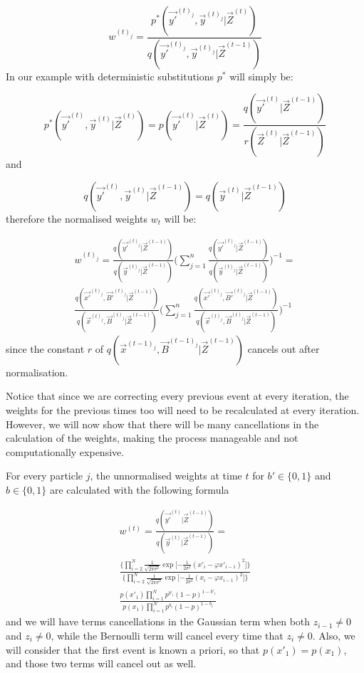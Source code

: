 \[
w^{(t)_j} = \frac{p^*(\vec{y'}^{(t)_j}, \vec{y}^{(t)_j} | \vec{Z}^{(t)})} {q(\vec{y'}^{(t)_j}, \vec{y}^{(t)_j}|\vec{Z}^{(t-1)})}
\]
In our example with deterministic substitutions $p^*$ will simply be:

\[
p^*(\vec{y'}^{(t)}, \vec{y}^{(t)} | \vec{Z}^{(t)}) = p(\vec{y'}^{(t)} | \vec{Z}^{(t)}) = \frac{ q(\vec{y'}^{(t)}|\vec{Z}^{(t-1)})} {r(\vec{Z}^{(t)} | \vec{Z}^{(t-1)})}
\]
and

\[
q(\vec{y'}^{(t)}, \vec{y}^{(t)} | \vec{Z}^{(t-1)}) = q(\vec{y}^{(t)} | \vec{Z}^{(t-1)})
\]
therefore the normalised weights $w_t$ will be:

\begin{multline*}
w^{(t)_j} = \frac{q(\vec{y'}^{(t)_j} | \vec{Z}^{(t-1)}) }{q(\vec{y}^{(t)_j} | \vec{Z}^{(t-1)})}\Bigg( \sum_{j=1}^n  \frac{q(\vec{y'}^{(t)_j} | \vec{Z}^{(t-1)}) }{q(\vec{y}^{(t)_j} | \vec{Z}^{(t-1)})}\Bigg)^{-1} = \\
\frac{q(\vec{x'}^{(t)_j}, \vec{B'}^{(t)_j} | \vec{Z}^{(t-1)}) }{q(\vec{x}^{(t)_j}, \vec{B}^{(t)_j} | \vec{Z}^{(t-1)})}\Bigg( \sum_{j=1}^n \frac{q(\vec{x'}^{(t)_j}, \vec{B'}^{(t)_j} | \vec{Z}^{(t-1)}) }{q(\vec{x}^{(t)_j}, \vec{B}^{(t)_j} | \vec{Z}^{(t-1)})}\Bigg)^{-1}
\end{multline*}
since the constant $r$ of $q(\vec{x}^{(t-1)_j},\vec{B}^{(t-1)_j} | \vec{Z}^{(t-1)})$ cancels out after normalisation.

Notice that since we are correcting every previous event at every iteration, the weights for the previous times too will need to be recalculated at every iteration. However, we will now show that there will be many cancellations in the calculation of the weights, making the process manageable and not computationally expensive.

For every particle $j$, the unnormalised weights at time $t$ for $b' \in \{0,1\}$ and $b \in \{0,1\}$ are calculated with the following formula

\begin{multline*}
w^{(t)} = \frac{q(\vec{y'}^{(t)} | \vec{Z}^{(t-1)}) }{q(\vec{y}^{(t)} | \vec{Z}^{(t-1)})} = \\
\frac{\bigg \{ \prod_{i=2}^{N}  \frac{1}{\sqrt{2 \pi \sigma^{2}}} \exp \bigg [ { - \frac{1}{2 \sigma^{2}} }  (x'_{i} - \varphi x'_{i-1})^{2} \bigg ] \bigg \} }{\bigg \{ \prod_{i=2}^{N}  \frac{1}{\sqrt{2 \pi \sigma^{2}}} \exp \bigg [ { - \frac{1}{2 \sigma^{2}} }  (x_{i} - \varphi x_{i-1})^{2} \bigg ] \bigg \} } \\
\frac{p(x'_{1}) \prod_{i=1}^{N} p^{b'_i} (1 - p)^{1-b'_{i}}  }{ p(x_{1}) \prod_{i=1}^{N} p^{b_i} (1 - p)^{1-b_{i}} }
\end{multline*}
and we will have terms cancellations in the Gaussian term when both $z_{i-1} \neq 0$ and $z_{i} \neq 0$, while the Bernoulli term will cancel every time that $z_{i} \neq 0$. Also, we will consider that the first event is known a priori, so that $p(x'_1)=p(x_1)$, and those two terms will cancel out as well.



